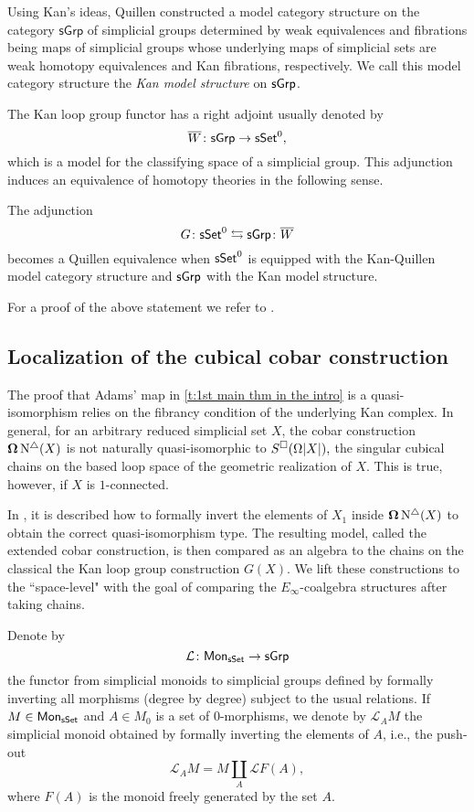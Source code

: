 Using Kan's ideas, Quillen constructed a model category structure on the category $\mathsf{sGrp}$ of simplicial groups determined by
weak equivalences and fibrations being maps of simplicial groups whose underlying maps of simplicial sets are weak homotopy equivalences and Kan fibrations, respectively. 
We call this model category structure the \textit{Kan model structure} on $\mathsf{sGrp}$.

The Kan loop group functor has a right adjoint usually denoted by 
$$\overline{W} \colon \mathsf{sGrp} \to \mathsf{sSet}^0,$$
which is a model for the classifying space of a simplicial group.
This adjunction induces an equivalence of homotopy theories in the following sense.

\begin{proposition} \label{kan}
    The adjunction
	$$G \colon \mathsf{sSet}^0 \leftrightarrows \mathsf{sGrp}\colon \overline{W}$$
	becomes a Quillen equivalence when $\mathsf{sSet}^0$ is equipped with the Kan-Quillen model category structure and $\mathsf{sGrp}$ with the Kan model structure.
\end{proposition}

For a proof of the above statement we refer to \cite[Chapter V]{goerss2009simplicial}.

\subsection{Localization of the cubical cobar construction}

The proof that Adams' map in \cref{t:1st main thm in the intro} is a quasi-isomorphism relies on the fibrancy condition of the underlying Kan complex.
In general, for an arbitrary reduced simplicial set $X$, the cobar construction $\operatorname{\mathbf{\Omega}} \operatorname{N^{\triangle}}(X)$ is not naturally quasi-isomorphic to $S^{\square}(\Omega|X|),$ the singular cubical chains on the based loop space of the geometric realization of $X$.
This is true, however, if $X$ is $1$-connected.

In \cite{hess2010cobar}, it is described how to formally invert the elements of $X_1$ inside $\operatorname{\mathbf{\Omega}} \operatorname{N^{\triangle}}(X)$ to obtain the correct quasi-isomorphism type.
The resulting model, called the extended cobar construction, is then compared as an algebra to the chains on the classical the Kan loop group construction $G(X)$.
We lift these constructions to the ``space-level" with the goal of comparing the $E_{\infty}$-coalgebra structures after taking chains.

Denote by
$$\mathcal{L} \colon \mathsf{Mon}_{\mathsf{sSet}} \to \mathsf{sGrp}$$
the functor from simplicial monoids to simplicial groups defined by formally inverting all morphisms (degree by degree) subject to the usual relations.
If $M \in \mathsf{Mon}_{\mathsf{sSet}}$ and $A \in M_0$ is a set of $0$-morphisms, we denote by $\mathcal{L}_AM$ the simplicial monoid obtained by formally inverting the elements of $A$, i.e., the push-out
$$\mathcal{L}_AM = M \coprod_{A} \mathcal{L}F(A),$$
where $F(A)$ is the monoid freely generated by the set $A$.

